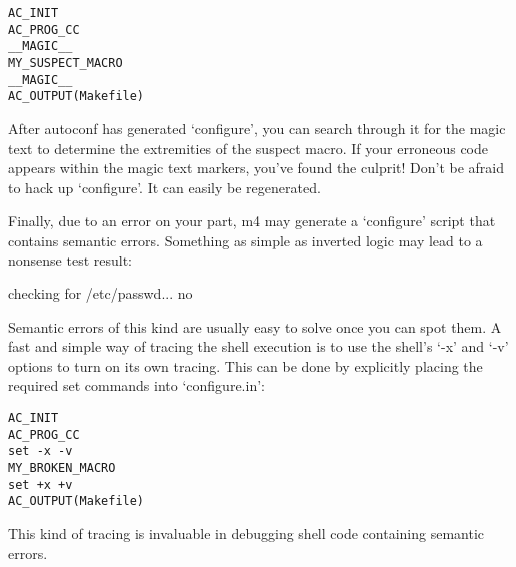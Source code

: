  	

\begin{verbatim}
AC_INIT
AC_PROG_CC
__MAGIC__
MY_SUSPECT_MACRO
__MAGIC__
AC_OUTPUT(Makefile)
\end{verbatim}

After autoconf has generated `configure', you can search through it for the magic text to determine the extremities of the suspect macro. If your erroneous code appears within the magic text markers, you've found the culprit! Don't be afraid to hack up `configure'. It can easily be regenerated.

Finally, due to an error on your part, m4 may generate a `configure' script that contains semantic errors. Something as simple as inverted logic may lead to a nonsense test result:

 	

checking for /etc/passwd... no

Semantic errors of this kind are usually easy to solve once you can spot them. A fast and simple way of tracing the shell execution is to use the shell's `-x' and `-v' options to turn on its own tracing. This can be done by explicitly placing the required set commands into `configure.in':

 	

\begin{verbatim}
AC_INIT
AC_PROG_CC
set -x -v
MY_BROKEN_MACRO
set +x +v
AC_OUTPUT(Makefile)
\end{verbatim}

This kind of tracing is invaluable in debugging shell code containing semantic errors. 



